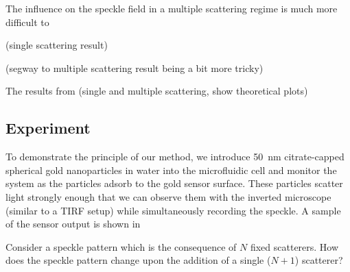The influence on the speckle field in a multiple scattering regime is much
more difficult to 

(single scattering result)

(segway to multiple scattering result being a bit more tricky)


The results from (single and multiple scattering, show theoretical plots)





\subsection{Experiment}
To demonstrate the principle of our method, we introduce
\SI{50}{\nano\meter} citrate-capped spherical gold nanoparticles in water
into the microfluidic cell and monitor the system as the particles adsorb
to the gold sensor surface.  These particles scatter light strongly enough
that we can observe them with the inverted microscope (similar to a TIRF
setup) while simultaneously recording the speckle. 
A sample of the sensor output is shown in 

Consider a speckle pattern which is the consequence of $N$ fixed
scatterers.  How does the speckle pattern change upon the addition of a
single ($N+1$) scatterer?  


